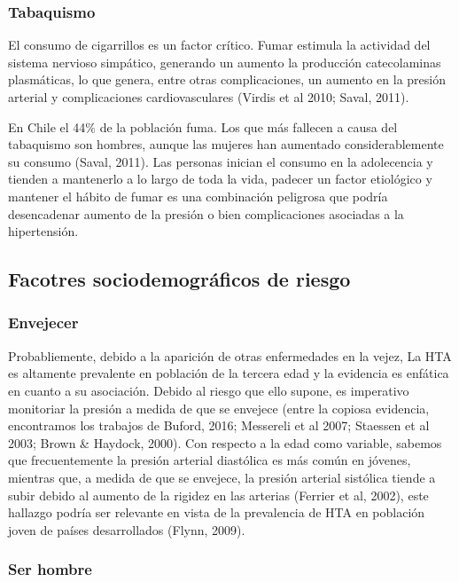 \documentclass{aa}
\begin{document}
\subsubsection{Tabaquismo}

El consumo de cigarrillos es un factor crítico. Fumar estimula la actividad del sistema nervioso simpático, generando un aumento la producción catecolaminas plasmáticas, lo que genera, entre otras complicaciones, un aumento en la presión arterial y complicaciones cardiovasculares (Virdis et al 2010; Saval, 2011).

En Chile el 44\% de la población fuma. Los que más fallecen a causa del tabaquismo son hombres, aunque las mujeres han aumentado considerablemente su consumo (Saval, 2011). Las personas inician el consumo en la adolecencia y tienden a mantenerlo a lo largo de toda la vida, padecer un factor etiológico y mantener el hábito de fumar es una combinación peligrosa que podría desencadenar aumento de la presión o bien complicaciones asociadas a la hipertensión.


\subsection{Facotres sociodemográficos de riesgo}

\subsubsection{Envejecer}

Probabliemente, debido a la aparición de otras enfermedades en la vejez, La HTA es altamente prevalente en población de la tercera edad y la evidencia es enfática en cuanto a su asociación. Debido al riesgo que ello supone, es imperativo monitoriar la presión a medida de que se envejece (entre la copiosa evidencia, encontramos los trabajos de Buford, 2016; Messereli et al 2007; Staessen et al 2003; Brown \& Haydock, 2000).  Con respecto a la edad como variable, sabemos que frecuentemente la presión arterial diastólica es más común en jóvenes, mientras que, a medida de que se envejece, la presión arterial sistólica tiende a subir debido al aumento de la rigidez en las arterias (Ferrier et al, 2002), este hallazgo podría ser relevante en vista de la prevalencia de HTA en población joven de países desarrollados (Flynn, 2009).

\subsubsection{Ser hombre}
\end{document}
